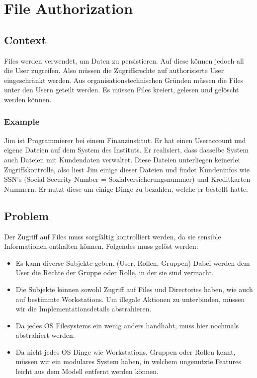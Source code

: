 \chapter{File Authorization}

\section{Context}
Files werden verwendet, um Daten zu persistieren. Auf diese können jedoch all die User zugreifen. Also müssen die Zugriffsrechte auf authorisierte User eingeschränkt werden. Aus organisationstechnischen Gründen müssen die Files unter den Usern geteilt werden. Es müssen Files kreiert, gelesen und gelöscht werden können.

\subsection{Example}
Jim ist Programmierer bei einem Finanzinstitut. Er hat einen Useraccount und eigene Dateien auf dem System des Instituts. Er realisiert, dass dasselbe System auch Dateien mit Kundendaten verwaltet. Diese Dateien unterliegen keinerlei Zugriffskontrolle, also liest Jim einige dieser Dateien und findet Kundeninfos wie SSN's (Social Security Number = Sozialversicherungsnummer) und Kreditkarten Nummern. Er nutzt diese um einige Dinge zu bezahlen, welche er bestellt hatte.

\section{Problem}
Der Zugriff auf Files muss sorgfältig kontrolliert werden, da sie sensible Informationen enthalten können. Folgendes muss gelöst werden:
\begin{itemize}
  \item Es kann diverse Subjekte geben. (User, Rollen, Gruppen) Dabei werden dem User die Rechte der Gruppe oder Rolle, in der sie sind vermacht.
  \item Die Subjekte können sowohl Zugriff auf Files und Directories haben, wie auch auf bestimmte Workstations. Um illegale Aktionen zu unterbinden, müssen wir die Implementationsdetails abstrahieren.
  \item Da jedes OS Filesystems ein wenig anders handhabt, muss hier nochmals abstrahiert werden.
  \item Da nicht jedes OS Dinge wie Workstations, Gruppen oder Rollen kennt, müssen wir ein modulares System haben, in welchem ungenutzte Features leicht aus dem Modell entfernt werden können.
\end{itemize}

